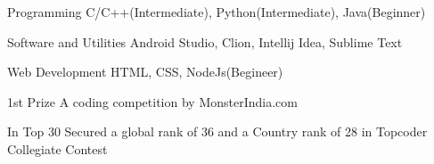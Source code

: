 \documentclass[11pt, a4paper]{awesome-cv}
\begin{document}
\begin{cvskills}

  \cvskill
    {Programming} %
    {C/C++(Intermediate), Python(Intermediate), Java(Beginner)} %

  \cvskill
    {Software and Utilities} %
    {Android Studio, Clion, Intellij Idea, Sublime Text} %

  \cvskill
    {Web Development} %
    {HTML, CSS, NodeJs(Begineer)} %

\end{cvskills}





\begin{cvhonors}

  \cvhonor
    {1st Prize} %
    {A coding competition by MonsterIndia.com} %
    {} %
    {} %
\end{cvhonors}




\begin{cvhonors}

  \cvhonor
    {In Top 30} %
    {Secured a global rank of 36 and a Country rank of 28 in Topcoder Collegiate Contest} %
    {} %
    {} %
   \end{cvhonors}
 
\end{document}
